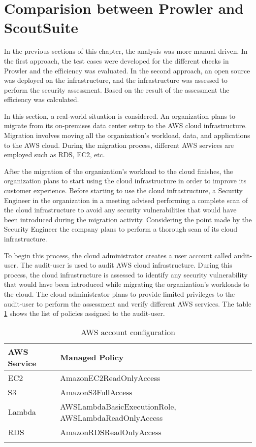 \section{Comparision between Prowler and ScoutSuite}

\par In the previous sections of this chapter, the analysis was more manual-driven.
In the first approach, the test cases were developed for the different checks in Prowler and the efficiency was evaluated.
In the second approach, an open source was deployed on the infrastructure, and the infrastructure was assessed to perform the security assessment.
Based on the result of the assessment the efficiency was calculated.
\\
\par In this section, a real-world situation is considered.
An organization plans to migrate from its on-premises data center setup to the AWS cloud infrastructure.
Migration involves moving all the organization’s workload, data, and applications to the AWS cloud.
During the migration process, different AWS services are employed such as RDS, EC2, etc.
\\
\par After the migration of the organization's workload
to the cloud finishes, the organization plans to start using the cloud infrastructure in order to improve its customer experience.
Before starting to use the cloud infrastructure, a Security Engineer in the organization in a meeting advised performing a complete scan of the cloud infrastructure to avoid any security vulnerabilities that would have been introduced during the migration activity.
Considering the point made by the Security Engineer the company plans to perform a thorough scan of its cloud infrastructure.
\\
\par To begin this process, the cloud administrator creates a user account called audit-user.
The audit-user is used to audit AWS cloud infrastructure.
During this process, the cloud infrastructure is assessed to identify any security vulnerability that would have been introduced while migrating the organization’s workloads to the cloud.
The cloud administrator plans to provide limited privileges to the audit-user to perform the assessment and verify different AWS services.
The table \ref{tab:accountconfiguration} shows the list
of policies assigned to the audit-user.
\\
\begin{longtable}{|p{6cm}|p{8cm}|}
    \hline
    \textbf{AWS Service} & \textbf{Managed Policy}\\
    \hline
    EC2 & AmazonEC2ReadOnlyAccess \\
    \hline
    S3 & AmazonS3FullAccess \\
    \hline
    Lambda & AWSLambdaBasicExecutionRole,
    AWSLambdaReadOnlyAccess \\
    \hline
    RDS & AmazonRDSReadOnlyAccess \\
    \hline
    \caption{AWS account configuration}
    \label{tab:accountconfiguration}
\end{longtable}



